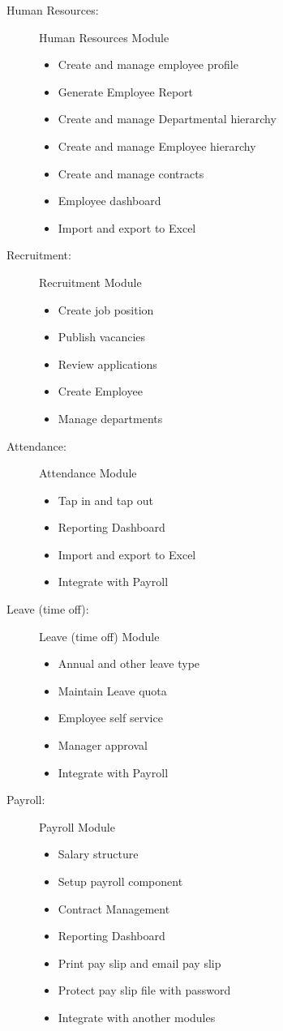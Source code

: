 \begin{description}
	\item[Human Resources:] Human Resources Module
	\begin{itemize}
		\item Create and manage employee profile
 		\item Generate Employee Report
 		\item Create and manage Departmental hierarchy
 		\item Create and manage Employee hierarchy
 		\item Create and manage contracts
 		\item Employee dashboard
 		\item Import and export to Excel
 	\end{itemize}
 	
 	\item[Recruitment:] Recruitment Module
	\begin{itemize}
		\item Create job position
		\item Publish vacancies
		\item Review applications
		\item Create Employee
		\item Manage departments
 	\end{itemize}
 	
 	\item[Attendance:] Attendance Module
	\begin{itemize}
		\item Tap in and tap out
		\item Reporting Dashboard
		\item Import and export to Excel
		\item Integrate with Payroll
 	\end{itemize}
 	
 	\item[Leave (time off):] Leave (time off) Module
	\begin{itemize}
		\item Annual and other leave type
		\item Maintain Leave quota
		\item Employee self service
		\item Manager approval
		\item Integrate with Payroll
 	\end{itemize}
 	
 	\item[Payroll:] Payroll Module
	\begin{itemize}
		\item Salary structure
		\item Setup payroll component 
		\item Contract Management
		\item Reporting Dashboard 
		\item Print pay slip and email pay slip
		\item Protect pay slip file with password
		\item Integrate with another modules
 	\end{itemize}
 	

\end{description}
